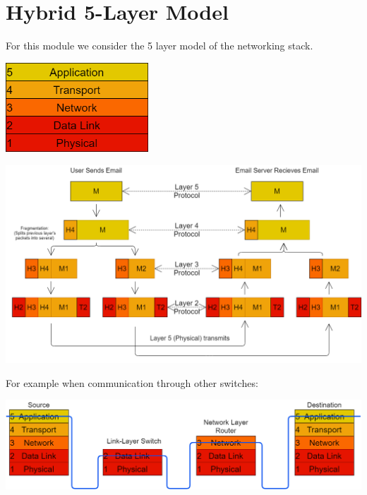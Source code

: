 \section{Hybrid 5-Layer Model}
For this module we consider the 5 layer model of the networking stack.
\begin{center}\includegraphics[width=0.4\textwidth]{basic_concepts_and_osi/images/internet protocol stack.png}\end{center}
\begin{center}\includegraphics[width=\textwidth]{basic_concepts_and_osi/images/layers working.png}\end{center}
For example when communication through other switches:
\begin{center}\includegraphics[width=\textwidth]{basic_concepts_and_osi/images/layer communication.png}\end{center}
